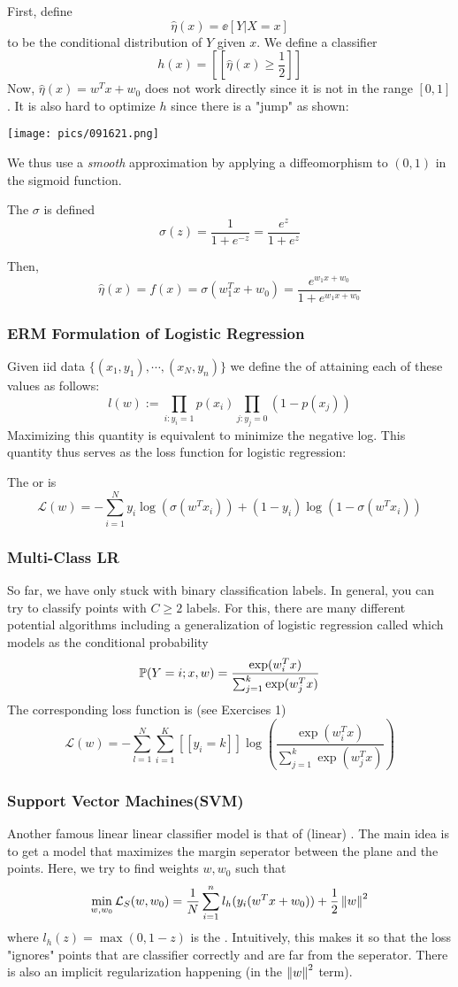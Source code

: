 \documentclass[11pt]{scrartcl}
\begin{document}
First, define $$\hat{\eta}(x)= \ee[Y|X=x]$$ to be the conditional distribution of $Y$ given $x$. We define a classifier $$h(x) = [[\hat{\eta}(x) \ge \frac{1}{2}]]$$
Now, $\hat{\eta}(x)=w^{T}x+w_0$ does not work directly since it is not in the range $[0,1]$. It is also hard to optimize $h$ since there is a "jump" as shown:
\begin{center}
    \texttt{[image: pics/091621.png]}
\end{center}
We thus use a \textit{smooth} approximation by applying a diffeomorphism to $(0,1)$ in the sigmoid function. 
\begin{defn}
The  $\sigma$ is defined $$\sigma(z)=\frac{1}{1+e^{-z}}=\frac{e^z}{1+e^z}$$ 
\end{defn}
Then, $$\hat{\eta}(x)=f(x)=\sigma(w_1^{T}x+w_0)=\frac{e^{w_1x+w_0}}{1+e^{w_1x+w_0}}$$

\subsubsection{ERM Formulation of Logistic Regression}
Given iid data $\{(x_1,y_1), \cdots, (x_N,y_n)\}$ we define the  of attaining each of these values as follows:
$$l(w) := \prod_{i:y_i=1}p(x_i)\prod_{j:y_j=0}(1-p(x_j))$$
Maximizing this quantity is equivalent to minimize the negative log. This quantity thus serves as the loss function for logistic regression:
\begin{defn}
The  or  is $$\mathcal{L}(w) = -\sum_{i=1}^{N} y_i\log(\sigma(w^{T}x_i))+(1-y_i)\log(1-\sigma(w^{T}x_i))$$
\end{defn}
\subsubsection{Multi-Class LR}
So far, we have only stuck with binary classification labels. In general, you can try to classify points with $C \ge 2$ labels. For this, there are many different potential algorithms including a generalization of logistic regression called  which models as the conditional probability $$\mathbb{P}(Y=i;x,w)=\frac{\exp(w_i^{T}x)}{\sum_{j=1}^{k}\exp(w_j^{T}x)}$$
The corresponding loss function is (see Exercises 1) $$\mathcal{L}(w)=-\sum_{l=1}^{N}\sum_{i=1}^{K}[[y_i=k]]\log\left(\frac{\exp(w_i^{T}x)}{\sum_{j=1}^{k}\exp(w_j^{T}x)}\right)$$

\subsubsection{Support Vector Machines(SVM)}
Another famous linear linear classifier model is that of (linear) . The main idea is to get a model that maximizes the margin seperator between the plane and the points. Here, we try to find weights $w,w_0$ such that  $$\min_{w,w_0}\mathcal{L}_S(w,w_0)=\frac{1}{N}\sum_{i=1}^{n}l_{h}(y_i(w^{T}x+w_0))+\frac{1}{2}\left\lVert w\right\rVert^2$$
where $l_h(z)=\max(0,1-z)$ is the . Intuitively, this makes it so that the loss "ignores" points that are classifier correctly and are far from the seperator. There is also an implicit regularization happening (in the $\left\lVert w\right\rVert^2$ term). 
\end{document}
